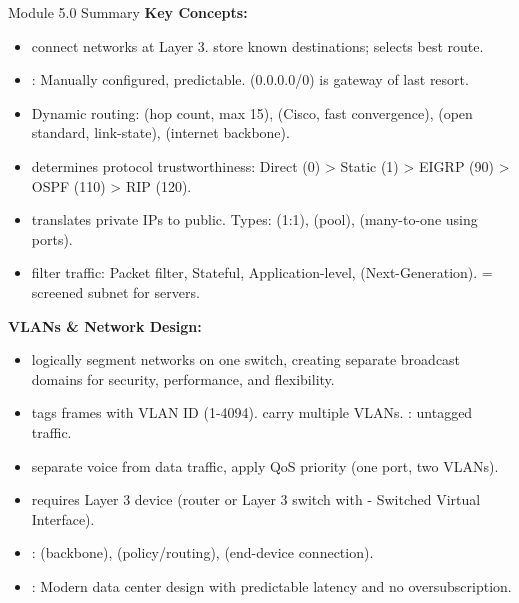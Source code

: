 \documentclass[aspectratio=169]{beamer}  %
\begin{document}
\begin{frame}[t,allowframebreaks]{Module 5.0 Summary}
    \scriptsize
    \textbf{Key Concepts:}
    \begin{itemize}
        \item {} connect networks at Layer 3.  store known destinations;  selects best route.
        \item {}: Manually configured, predictable.  (0.0.0.0/0) is gateway of last resort.
        \item Dynamic routing:  (hop count, max 15),  (Cisco, fast convergence),  (open standard, link-state),  (internet backbone).
        \framebreak
        \item {} determines protocol trustworthiness: Direct (0) > Static (1) > EIGRP (90) > OSPF (110) > RIP (120).
        \item {} translates private IPs to public. Types:  (1:1),  (pool),  (many-to-one using ports).
        \item {} filter traffic: Packet filter, Stateful, Application-level,  (Next-Generation).  = screened subnet for servers.
    \end{itemize}
    \framebreak
    
    \vspace{0.3em}
    \textbf{VLANs \& Network Design:}
    \begin{itemize}
        \item {} logically segment networks on one switch, creating separate broadcast domains for security, performance, and flexibility.
        \item {} tags frames with VLAN ID (1-4094).  carry multiple VLANs. : untagged traffic.
        \item {} separate voice from data traffic, apply QoS priority (one port, two VLANs).
        \item {} requires Layer 3 device (router or Layer 3 switch with  - Switched Virtual Interface).
        \item {}:  (backbone),  (policy/routing),  (end-device connection).
        \item {}: Modern data center design with predictable latency and no oversubscription.
    \end{itemize}
\end{frame}
\end{document}
